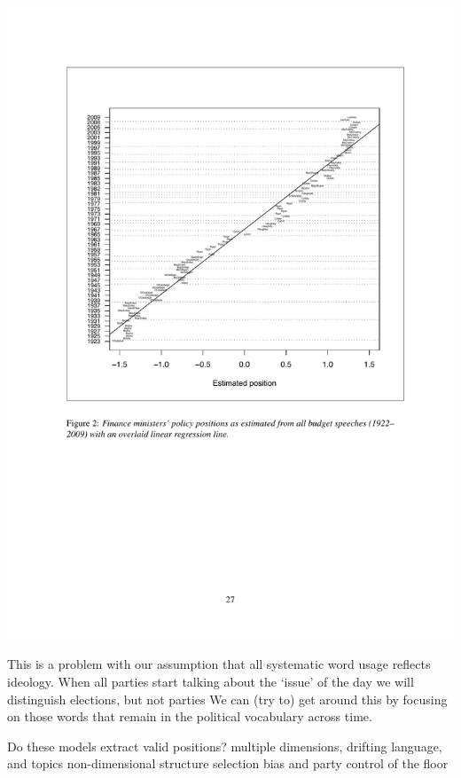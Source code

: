 \documentclass{mediumfoils}
\begin{document}
\centerline{\includegraphics[scale=.9]{pictures/HandMfig2}}


\ita
\itm This is a problem with our assumption that all systematic word usage reflects ideology.
\itm When all parties start talking about the `issue' of the day we will distinguish elections, but not parties
\itm We can (try to) get around this by focusing on those words that remain in the political vocabulary across time.
\itz




Do these models extract valid positions?
\ita
\itm multiple dimensions, drifting language, and topics
\itm non-dimensional structure
\itm selection bias and party control of the floor
\itz
\end{document}
